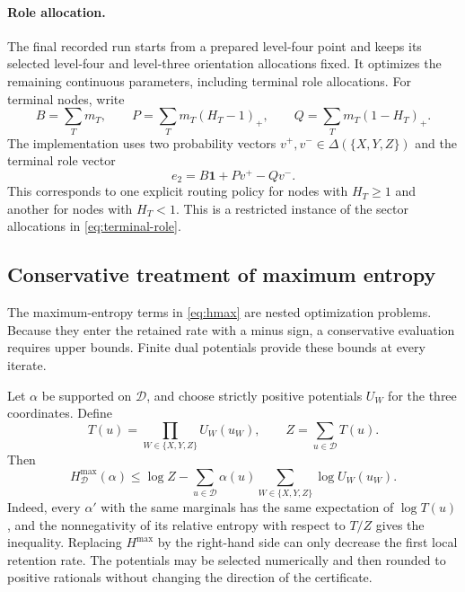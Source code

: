 \documentclass[11pt,a4paper]{article}
\newcommand{\WW}{\{X,Y,Z\}}
\begin{document}
\paragraph{Role allocation.}
The final recorded run starts from a prepared level-four point and keeps its selected level-four and level-three orientation allocations fixed. It optimizes the remaining continuous parameters, including terminal role allocations. For terminal nodes, write
\begin{equation}\label{eq:terminal-pooling}
B=\sum_Tm_T,\qquad
P=\sum_Tm_T(H_T-1)_+,\qquad
Q=\sum_Tm_T(1-H_T)_+.
\end{equation}
The implementation uses two probability vectors $v^+,v^-\in\Delta(\WW)$ and the terminal role vector
\begin{equation}\label{eq:terminal-two-policies}
e_2=B\mathbf1+P v^+-Q v^-.
\end{equation}
This corresponds to one explicit routing policy for nodes with $H_T\ge1$ and another for nodes with $H_T<1$. This is a restricted instance of the sector allocations in \cref{eq:terminal-role}.

\subsection{Conservative treatment of maximum entropy}\label{sec:gibbs}

The maximum-entropy terms in \cref{eq:hmax} are nested optimization problems. Because they enter the retained rate with a minus sign, a conservative evaluation requires upper bounds. Finite dual potentials provide these bounds at every iterate.

Let $\alpha$ be supported on $\mathcal D$, and choose strictly positive potentials $U_W$ for the three coordinates. Define
\begin{equation}\label{eq:gibbs}
T(u)=\prod_{W\in\WW}U_W(u_W),\qquad Z=\sum_{u\in\mathcal D}T(u).
\end{equation}
Then
\begin{equation}\label{eq:gibbs-bound}
H_{\mathcal D}^{\max}(\alpha)
\le \log Z-\sum_{u\in\mathcal D}\alpha(u)
       \sum_{W\in\WW}\log U_W(u_W).
\end{equation}
Indeed, every $\alpha'$ with the same marginals has the same expectation of $\log T(u)$, and the nonnegativity of its relative entropy with respect to $T/Z$ gives the inequality. Replacing $H^{\max}$ by the right-hand side can only decrease the first local retention rate. The potentials may be selected numerically and then rounded to positive rationals without changing the direction of the certificate.
\end{document}
